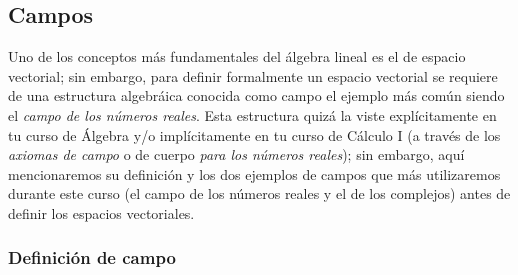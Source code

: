 \documentclass[12pt]{article}
\begin{document}
\subsection{Campos}
Uno de los conceptos más fundamentales del álgebra lineal es el de espacio vectorial; sin embargo, para definir formalmente un espacio vectorial se requiere de una estructura algebráica conocida como campo \textemdash el ejemplo más común siendo el \emph{campo de los números reales}. Esta estructura quizá la viste explícitamente en tu curso de Álgebra y/o implícitamente en tu curso de Cálculo I (a través de los \textit{axiomas de campo} \textemdash o de cuerpo\textemdash\hspace{1.5mm} \textit{para los números reales}); sin embargo, aquí mencionaremos su definición y los dos ejemplos de campos que más utilizaremos durante este curso (el campo de los números reales y el de los complejos) antes de definir los espacios vectoriales.

\subsubsection{Definición de campo} \label{Def:Campo}
\end{document}
